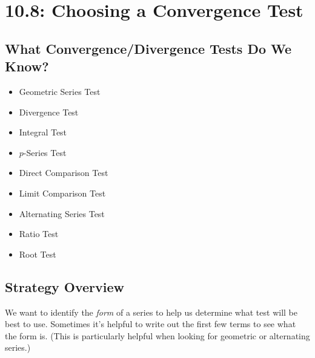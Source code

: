 \documentclass[12pt]{article}
\begin{document}
\section*{10.8: Choosing a Convergence Test}


\vspace{5mm}

\subsection*{What Convergence/Divergence Tests Do We Know?}
\begin{multicols}{3}
\begin{itemize}
\item Geometric Series Test
\item Divergence Test
\item Integral Test
\item $p$-Series Test
\item Direct Comparison Test
\item Limit Comparison Test
\item Alternating Series Test
\item Ratio Test
\item Root Test
\end{itemize}
\end{multicols}

\subsection*{Strategy Overview}

We want to identify the \textit{form} of a series to help us determine what test will be best to use. Sometimes it's helpful to write out the first few terms to see what the form is. (This is particularly helpful when looking for geometric or alternating series.)
\end{document}
